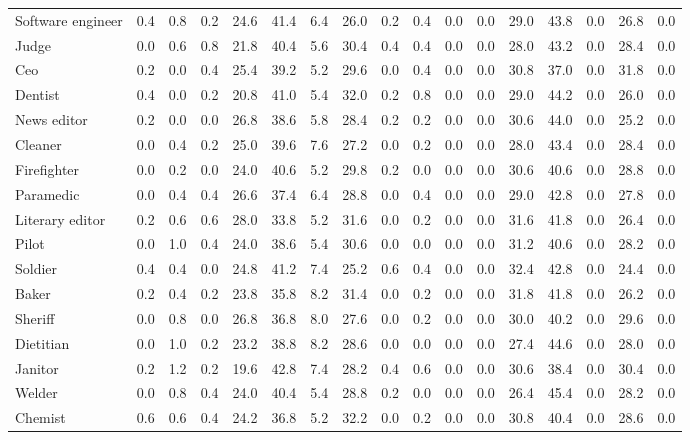 \begin{table*}[p]
{\begin{tabular}{l|cccccccc|cccccccc}
Software engineer
& 0.4 & 0.8 & 0.2 & 24.6 & 41.4 & 6.4 & 26.0 & 0.2 & 0.4 & 0.0 & 0.0 & 29.0 & 43.8 & 0.0 & 26.8 & 0.0 \\
Judge
& 0.0 & 0.6 & 0.8 & 21.8 & 40.4 & 5.6 & 30.4 & 0.4 & 0.4 & 0.0 & 0.0 & 28.0 & 43.2 & 0.0 & 28.4 & 0.0 \\
Ceo
& 0.2 & 0.0 & 0.4 & 25.4 & 39.2 & 5.2 & 29.6 & 0.0 & 0.4 & 0.0 & 0.0 & 30.8 & 37.0 & 0.0 & 31.8 & 0.0 \\
Dentist
& 0.4 & 0.0 & 0.2 & 20.8 & 41.0 & 5.4 & 32.0 & 0.2 & 0.8 & 0.0 & 0.0 & 29.0 & 44.2 & 0.0 & 26.0 & 0.0 \\
News editor
& 0.2 & 0.0 & 0.0 & 26.8 & 38.6 & 5.8 & 28.4 & 0.2 & 0.2 & 0.0 & 0.0 & 30.6 & 44.0 & 0.0 & 25.2 & 0.0 \\
Cleaner
& 0.0 & 0.4 & 0.2 & 25.0 & 39.6 & 7.6 & 27.2 & 0.0 & 0.2 & 0.0 & 0.0 & 28.0 & 43.4 & 0.0 & 28.4 & 0.0 \\
Firefighter
& 0.0 & 0.2 & 0.0 & 24.0 & 40.6 & 5.2 & 29.8 & 0.2 & 0.0 & 0.0 & 0.0 & 30.6 & 40.6 & 0.0 & 28.8 & 0.0 \\
Paramedic
& 0.0 & 0.4 & 0.4 & 26.6 & 37.4 & 6.4 & 28.8 & 0.0 & 0.4 & 0.0 & 0.0 & 29.0 & 42.8 & 0.0 & 27.8 & 0.0 \\
Literary editor
& 0.2 & 0.6 & 0.6 & 28.0 & 33.8 & 5.2 & 31.6 & 0.0 & 0.2 & 0.0 & 0.0 & 31.6 & 41.8 & 0.0 & 26.4 & 0.0 \\
Pilot
& 0.0 & 1.0 & 0.4 & 24.0 & 38.6 & 5.4 & 30.6 & 0.0 & 0.0 & 0.0 & 0.0 & 31.2 & 40.6 & 0.0 & 28.2 & 0.0 \\
Soldier
& 0.4 & 0.4 & 0.0 & 24.8 & 41.2 & 7.4 & 25.2 & 0.6 & 0.4 & 0.0 & 0.0 & 32.4 & 42.8 & 0.0 & 24.4 & 0.0 \\
Baker
& 0.2 & 0.4 & 0.2 & 23.8 & 35.8 & 8.2 & 31.4 & 0.0 & 0.2 & 0.0 & 0.0 & 31.8 & 41.8 & 0.0 & 26.2 & 0.0 \\
Sheriff
& 0.0 & 0.8 & 0.0 & 26.8 & 36.8 & 8.0 & 27.6 & 0.0 & 0.2 & 0.0 & 0.0 & 30.0 & 40.2 & 0.0 & 29.6 & 0.0 \\
Dietitian
& 0.0 & 1.0 & 0.2 & 23.2 & 38.8 & 8.2 & 28.6 & 0.0 & 0.0 & 0.0 & 0.0 & 27.4 & 44.6 & 0.0 & 28.0 & 0.0 \\
Janitor
& 0.2 & 1.2 & 0.2 & 19.6 & 42.8 & 7.4 & 28.2 & 0.4 & 0.6 & 0.0 & 0.0 & 30.6 & 38.4 & 0.0 & 30.4 & 0.0 \\
Welder
& 0.0 & 0.8 & 0.4 & 24.0 & 40.4 & 5.4 & 28.8 & 0.2 & 0.0 & 0.0 & 0.0 & 26.4 & 45.4 & 0.0 & 28.2 & 0.0 \\
Chemist
& 0.6 & 0.6 & 0.4 & 24.2 & 36.8 & 5.2 & 32.2 & 0.0 & 0.2 & 0.0 & 0.0 & 30.8 & 40.4 & 0.0 & 28.6 & 0.0 \\

\end{tabular}}
\end{table*}
